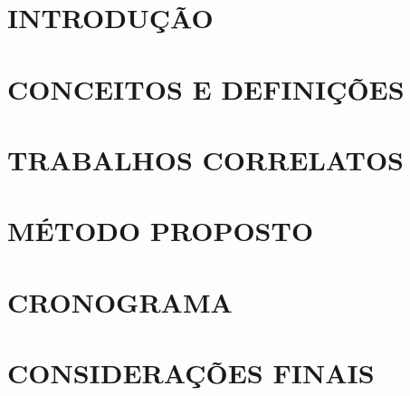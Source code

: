 \documentclass[
	12pt,				%
    oneside,			%
	a4paper,			%
	chapter=TITLE,		%
	english,			%
	brazil				%
	]{abntex2}
\begin{document}
\chapter{INTRODUÇÃO}


\chapter{CONCEITOS E DEFINIÇÕES}


\chapter{TRABALHOS CORRELATOS}



\chapter{MÉTODO PROPOSTO}


\chapter{CRONOGRAMA}


%

\chapter{CONSIDERAÇÕES FINAIS}



\end{document}
